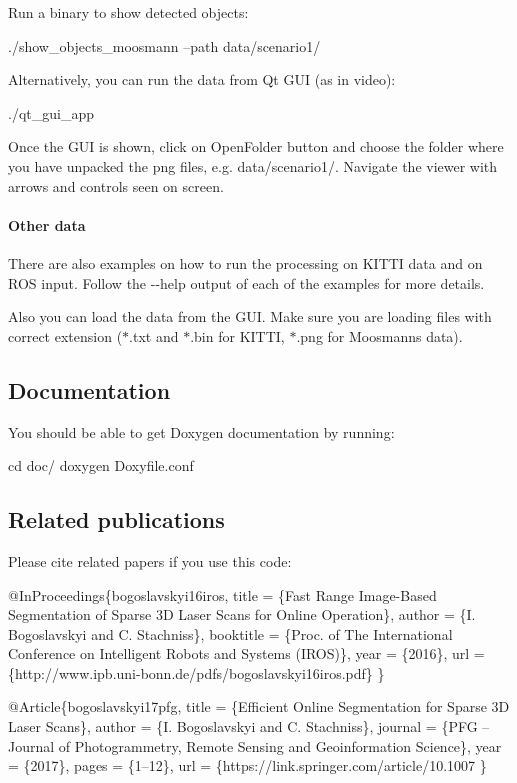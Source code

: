 Run a binary to show detected objects\+: 
\begin{DoxyCode}
./show\_objects\_moosmann --path data/scenario1/
\end{DoxyCode}


Alternatively, you can run the data from Qt G\+UI (as in video)\+: 
\begin{DoxyCode}
./qt\_gui\_app
\end{DoxyCode}
 Once the G\+UI is shown, click on {\ttfamily Open\+Folder} button and choose the folder where you have unpacked the {\ttfamily png} files, e.\+g. {\ttfamily data/scenario1/}. Navigate the viewer with arrows and controls seen on screen.

\paragraph*{Other data}

There are also examples on how to run the processing on K\+I\+T\+TI data and on R\+OS input. Follow the {\ttfamily -\/-\/help} output of each of the examples for more details.

Also you can load the data from the G\+UI. Make sure you are loading files with correct extension ({\ttfamily $\ast$.txt} and {\ttfamily $\ast$.bin} for K\+I\+T\+TI, {\ttfamily $\ast$.png} for Moosmann\textquotesingle{}s data).

\subsection*{Documentation}

You should be able to get Doxygen documentation by running\+: 
\begin{DoxyCode}
cd doc/
doxygen Doxyfile.conf
\end{DoxyCode}


\subsection*{Related publications}

Please cite related papers if you use this code\+:


\begin{DoxyCode}
@InProceedings\{bogoslavskyi16iros,
title     = \{Fast Range Image-Based Segmentation of Sparse 3D Laser Scans for Online Operation\},
author    = \{I. Bogoslavskyi and C. Stachniss\},
booktitle = \{Proc. of The International Conference on Intelligent Robots and Systems (IROS)\},
year      = \{2016\},
url       = \{http://www.ipb.uni-bonn.de/pdfs/bogoslavskyi16iros.pdf\}
\}
\end{DoxyCode}



\begin{DoxyCode}
@Article\{bogoslavskyi17pfg,
title   = \{Efficient Online Segmentation for Sparse 3D Laser Scans\},
author  = \{I. Bogoslavskyi and C. Stachniss\},
journal = \{PFG -- Journal of Photogrammetry, Remote Sensing and Geoinformation Science\},
year    = \{2017\},
pages   = \{1--12\},
url     = \{https://link.springer.com/article/10.1007%
\}
\end{DoxyCode}
 